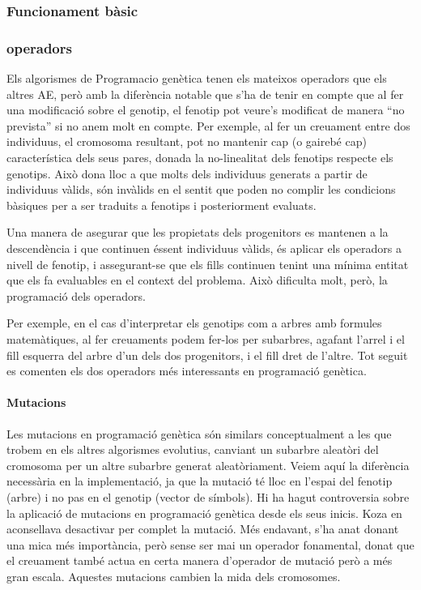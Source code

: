 \subsubsection{Funcionament bàsic} %
\label{ssub:Funcionament basic}

\subsubsection{operadors} %
\label{ssub:operadors}

Els algorismes de Programacio genètica tenen els mateixos operadors que els
altres AE, però amb la diferència notable que s'ha de tenir en compte que al fer
una modificació sobre el genotip, el fenotip pot veure's modificat de manera
``no prevista'' si no anem molt en compte.  Per exemple, al fer un creuament
entre dos individuus, el cromosoma resultant, pot no mantenir cap (o gairebé
cap) característica dels seus pares, donada la no-linealitat dels fenotips
respecte els genotips.  Això dona lloc a que molts dels individuus generats a
partir de individuus vàlids, són invàlids en el sentit que poden no complir les
condicions bàsiques per a ser traduits a fenotips i posteriorment evaluats.

Una manera de asegurar que les propietats dels progenitors es mantenen a la
descendència i que continuen éssent individuus vàlids, és aplicar els operadors
a nivell de fenotip, i assegurant-se que els fills continuen tenint una mínima
entitat que els fa evaluables en el context del problema.  Això dificulta molt,
però, la programació dels operadors.

Per exemple, en el cas d'interpretar els genotips com a arbres amb formules
matemàtiques, al fer creuaments podem fer-los per subarbres, agafant l'arrel i
el fill esquerra del arbre d'un dels dos progenitors, i el fill dret de l'altre.
Tot seguit es comenten els dos operadors més interessants en programació
genètica.

\paragraph{Mutacions} %
\label{par:Mutacions}
Les mutacions en programació genètica són similars conceptualment a les que
trobem en els altres algorismes evolutius, canviant un subarbre aleatòri del
cromosoma per un altre subarbre generat aleatòriament.  Veiem aquí la diferència
necessària en la implementació, ja que la mutació té lloc en l'espai del fenotip
(arbre) i no pas en el genotip (vector de símbols).  Hi ha hagut controversia
sobre la aplicació de mutacions en programació genètica desde els seus inicis.
Koza en \cite{koza:92} aconsellava desactivar per complet la mutació.   Més
endavant, s'ha anat donant una mica més importància, però sense ser mai un
operador fonamental, donat que el creuament també actua en certa manera
d'operador de mutació però a més gran escala.  Aquestes mutacions cambien la
mida dels cromosomes.

